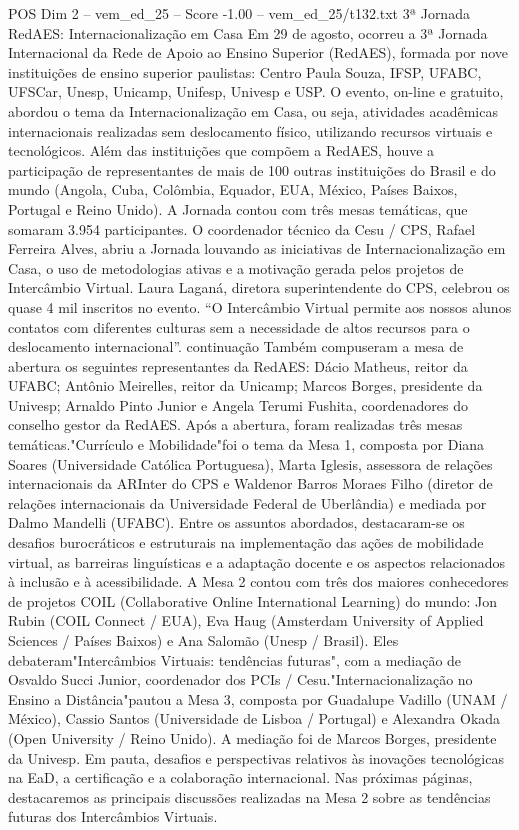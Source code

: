 \begin{textsample}{POS Dim 2 – vem\_ed\_25 – Score -1.00 – vem\_ed\_25/t132.txt}  \label{ex:f2_pos_056}
3ª Jornada RedAES: Internacionalização em Casa Em 29 de agosto, ocorreu a 3ª Jornada Internacional da Rede de Apoio ao Ensino Superior (RedAES), formada por nove instituições de ensino superior paulistas: Centro Paula Souza, IFSP, UFABC, UFSCar, Unesp, Unicamp, Unifesp, Univesp e USP.
O evento, on-line e gratuito, abordou o tema da Internacionalização em Casa, ou seja, atividades acadêmicas internacionais realizadas sem deslocamento físico, utilizando recursos virtuais e tecnológicos.
Além das instituições que compõem a RedAES, houve a participação de representantes de mais de 100 outras instituições do Brasil e do mundo (Angola, Cuba, Colômbia, Equador, EUA, México, Países Baixos, Portugal e Reino Unido).
A Jornada contou com três mesas temáticas, que somaram 3.954 participantes.
O coordenador técnico da Cesu / CPS, Rafael Ferreira Alves, abriu a Jornada louvando as iniciativas de Internacionalização em Casa, o uso de metodologias ativas e a motivação gerada pelos projetos de Intercâmbio Virtual.
Laura Laganá, diretora superintendente do CPS, celebrou os quase 4 mil inscritos no evento. “O Intercâmbio Virtual permite aos nossos alunos contatos com diferentes culturas sem a necessidade de altos recursos para o deslocamento internacional”. continuação Também compuseram a mesa de abertura os seguintes representantes da RedAES: Dácio Matheus, reitor da UFABC; Antônio Meirelles, reitor da Unicamp; Marcos Borges, presidente da Univesp; Arnaldo Pinto Junior e Angela Terumi Fushita, coordenadores do conselho gestor da RedAES.
Após a abertura, foram realizadas três mesas temáticas."Currículo e Mobilidade"foi o tema da Mesa 1, composta por Diana Soares (Universidade Católica Portuguesa), Marta Iglesis, assessora de relações internacionais da ARInter do CPS e Waldenor Barros Moraes Filho (diretor de relações internacionais da Universidade Federal de Uberlândia) e mediada por Dalmo Mandelli (UFABC).
Entre os assuntos abordados, destacaram-se os desafios burocráticos e estruturais na implementação das ações de mobilidade virtual, as barreiras linguísticas e a adaptação docente e os aspectos relacionados à inclusão e à acessibilidade.
A Mesa 2 contou com três dos maiores conhecedores de projetos COIL (Collaborative Online International Learning) do mundo: Jon Rubin (COIL Connect / EUA), Eva Haug (Amsterdam University of Applied Sciences / Países Baixos) e Ana Salomão (Unesp / Brasil).
Eles debateram"Intercâmbios Virtuais: tendências futuras", com a mediação de Osvaldo Succi Junior, coordenador dos PCIs / Cesu."Internacionalização no Ensino a Distância"pautou a Mesa 3, composta por Guadalupe Vadillo (UNAM / México), Cassio Santos (Universidade de Lisboa / Portugal) e Alexandra Okada (Open University / Reino Unido).
A mediação foi de Marcos Borges, presidente da Univesp.
Em pauta, desafios e perspectivas relativos às inovações tecnológicas na EaD, a certificação e a colaboração internacional.
Nas próximas páginas, destacaremos as principais discussões realizadas na Mesa 2 sobre as tendências futuras dos Intercâmbios Virtuais.

\end{textsample}
